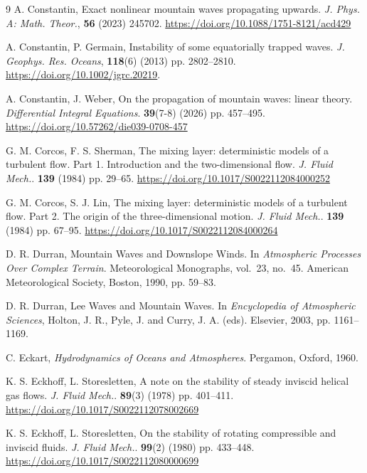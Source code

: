 \documentclass[reqno]{amsart}
\begin{document}
\begin{thebibliography}{9}
A. Constantin, Exact nonlinear mountain waves propagating upwards. \textit{J. Phys. A: Math. Theor.}, {\bf 56} (2023) 245702. \url{https://doi.org/10.1088/1751-8121/acd429}



A. Constantin, P. Germain, Instability of some equatorially trapped waves. \textit{J. Geophys. Res. Oceans}, {\bf 118}(6) (2013) pp. 2802--2810.
 \url{https://doi.org/10.1002/jgrc.20219}.



A. Constantin, J. Weber, On the propagation of mountain waves: linear theory. \textit{Differential Integral Equations}. {\bf 39}(7-8) (2026) pp. 457--495. \url{https://doi.org/10.57262/die039-0708-457}


G. M. Corcos, F. S. Sherman, The mixing layer: deterministic models of a turbulent flow. Part 1. Introduction and the two-dimensional flow. \textit{J. Fluid Mech.}. {\bf 139} (1984) pp. 29--65.
 \url{https://doi.org/10.1017/S0022112084000252}

G. M. Corcos, S. J. Lin,  The mixing layer: deterministic models of a turbulent flow. Part 2. The origin of the three-dimensional motion. \textit{J. Fluid Mech.}. {\bf 139} (1984) pp. 67--95.
 \url{https://doi.org/10.1017/S0022112084000264}


D. R. Durran, Mountain Waves and Downslope Winds. In {\em Atmospheric Processes Over Complex Terrain}. Meteorological Monographs, vol.~23, no.~45. American Meteorological Society, Boston, 1990, pp. 59--83.

D. R. Durran, Lee Waves and Mountain Waves. In {\em Encyclopedia of Atmospheric Sciences}, Holton, J. R., Pyle, J. and Curry, J. A. (eds). Elsevier, 2003, pp. 1161--1169.



C. Eckart,  {\em Hydrodynamics of Oceans and Atmospheres}. Pergamon, Oxford, 1960.




K. S. Eckhoff, L. Storesletten,  A note on the stability of steady inviscid helical gas flows. \textit{J. Fluid Mech.}. {\bf 89}(3) (1978) pp. 401--411. \url{https://doi.org/10.1017/S0022112078002669}

K. S. Eckhoff, L. Storesletten,   On the stability of rotating compressible and inviscid fluids. \textit{J. Fluid Mech.}. {\bf 99}(2) (1980) pp. 433--448. \url{https://doi.org/10.1017/S0022112080000699}




\end{thebibliography}
\end{document}
